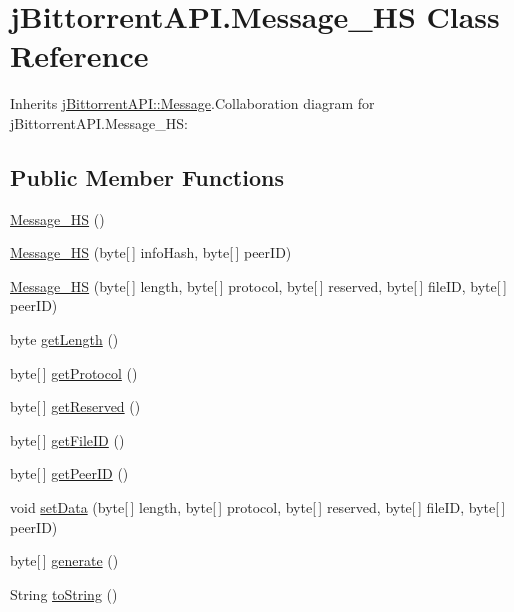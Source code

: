 \hypertarget{classj_bittorrent_a_p_i_1_1_message___h_s}{
\section{jBittorrentAPI.Message\_\-HS Class Reference}
\label{classj_bittorrent_a_p_i_1_1_message___h_s}
}


Inherits \hyperlink{classj_bittorrent_a_p_i_1_1_message}{jBittorrentAPI::Message}.Collaboration diagram for jBittorrentAPI.Message\_\-HS:\subsection*{Public Member Functions}
\begin{DoxyCompactItemize}
\item 
\hyperlink{classj_bittorrent_a_p_i_1_1_message___h_s_a1c67b8552e5e64459a83d5947b69bd34}{Message\_\-HS} ()
\item 
\hyperlink{classj_bittorrent_a_p_i_1_1_message___h_s_a25dc27ff305744055c516dd90835c2c7}{Message\_\-HS} (byte\mbox{[}$\,$\mbox{]} infoHash, byte\mbox{[}$\,$\mbox{]} peerID)
\item 
\hyperlink{classj_bittorrent_a_p_i_1_1_message___h_s_a720a309bdaf8566f98a351f7e8d98c05}{Message\_\-HS} (byte\mbox{[}$\,$\mbox{]} length, byte\mbox{[}$\,$\mbox{]} protocol, byte\mbox{[}$\,$\mbox{]} reserved, byte\mbox{[}$\,$\mbox{]} fileID, byte\mbox{[}$\,$\mbox{]} peerID)
\item 
byte \hyperlink{classj_bittorrent_a_p_i_1_1_message___h_s_a847d44cfb0f8c03c4ed3b81a41cff240}{getLength} ()
\item 
byte\mbox{[}$\,$\mbox{]} \hyperlink{classj_bittorrent_a_p_i_1_1_message___h_s_a16053a0dcd33bc941bb0e6c173ccea79}{getProtocol} ()
\item 
byte\mbox{[}$\,$\mbox{]} \hyperlink{classj_bittorrent_a_p_i_1_1_message___h_s_acd526d44eed4c9a99e428024e7648890}{getReserved} ()
\item 
byte\mbox{[}$\,$\mbox{]} \hyperlink{classj_bittorrent_a_p_i_1_1_message___h_s_a3c6ed7fb69274f946919bef1ce8f0968}{getFileID} ()
\item 
byte\mbox{[}$\,$\mbox{]} \hyperlink{classj_bittorrent_a_p_i_1_1_message___h_s_a59ac855807e9c0821d5633b58aa88d05}{getPeerID} ()
\item 
void \hyperlink{classj_bittorrent_a_p_i_1_1_message___h_s_a97ccea86b2ccb3f20badf4ea3952d247}{setData} (byte\mbox{[}$\,$\mbox{]} length, byte\mbox{[}$\,$\mbox{]} protocol, byte\mbox{[}$\,$\mbox{]} reserved, byte\mbox{[}$\,$\mbox{]} fileID, byte\mbox{[}$\,$\mbox{]} peerID)
\item 
byte\mbox{[}$\,$\mbox{]} \hyperlink{classj_bittorrent_a_p_i_1_1_message___h_s_a65f7878db0225ce3f390a63aa2548673}{generate} ()
\item 
String \hyperlink{classj_bittorrent_a_p_i_1_1_message___h_s_ae98c9d701d858087fd3b75df247b1ca9}{toString} ()
\end{DoxyCompactItemize}


